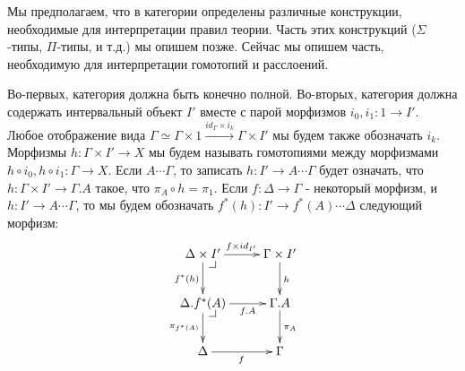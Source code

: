 \documentclass{amsart}
\makeatletter
\theoremstyle{definition}
\theoremstyle{remark}
\newcommand{\pb}[1][dr]{\save*!/#1-1.2pc/#1:(-1,1)@^{|-}\restore}
\newcommand{\po}[1][dr]{\save*!/#1+1.2pc/#1:(1,-1)@^{|-}\restore}
\numberwithin{figure}{section}
\makeatother
\begin{document}
Мы предполагаем, что в категории определены различные конструкции, необходимые для интерпретации правил теории.
Часть этих конструкций ($\Sigma$-типы, $\Pi$-типы, и т.д.) мы опишем позже.
Сейчас мы опишем часть, необходимую для интерпретации гомотопий и расслоений.

Во-первых, категория должна быть конечно полной.
Во-вторых, категория должна содержать интервальный объект $I'$ вместе с парой морфизмов $i_0, i_1 : 1 \to I'$.
Любое отображение вида $\Gamma \simeq \Gamma \times 1 \xrightarrow{id_\Gamma \times i_k} \Gamma \times I'$ мы будем также обозначать $i_k$.
Морфизмы $h : \Gamma \times I' \to X$ мы будем называть гомотопиями между морфизмами $h \circ i_0, h \circ i_1 : \Gamma \to X$.
Если $A \dotsb \Gamma$, то записать $h : I' \to A \dotsb \Gamma$ будет означать, что $h : \Gamma \times I' \to \Gamma.A$ такое, что $\pi_A \circ h = \pi_1$.
Если $f : \Delta \to \Gamma$ - некоторый морфизм, и $h : I' \to A \dotsb \Gamma$, то мы будем обозначать $f^*(h) : I' \to f^*(A) \dotsb \Delta$ следующий морфизм:
\[ \xymatrix{ \Delta \times I' \ar[r]^{f \times id_{I'}} \ar[d]_{f^*(h)} \pb & \Gamma \times I' \ar[d]^h \\
              \Delta.f^*(A) \ar[r]_-{f.A} \ar[d]_{\pi_{f^*(A)}} \pb          & \Gamma.A \ar[d]^{\pi_A} \\
              \Delta \ar[r]_f                                                & \Gamma
                 }\]

\begin{comment}
Также в категории должен быть выбран насыщенный класс морфизмов, которые мы называем \emph{тривиальными корасслоениями}.
Морфизмы, которые имеют правое свойство поднятия по отношению к тривиальным корасслоениям, мы называем \emph{расслоениями}.
Мы требуем, чтобы для любого $A \dotsb \Gamma$ морфизмы $\pi_A : \Gamma.A \to \Gamma$ являлись расслоениями.

Тривиальные корасслоения должны содержать морфизмы вида $i_0 : \Gamma \to \Gamma \times I'$ и
    $(\Gamma \times I' \amalg \Gamma \times I') \amalg_{\Gamma \amalg \Gamma} \Gamma \times I' \to \Gamma \times I' \times I'$, которые определяются как в следующей диаграмме:
\[ \xymatrix@-1pc{ \Gamma \amalg \Gamma \ar[rr]^{i_0 \amalg i_0} \ar[dd]_{[i_0, i_1]} & & \Gamma \times I' \amalg \Gamma \times I' \ar[dd] \ar[rddd]^{[i_0, i_1]} \\ \\
\Gamma \times I' \ar[rr] \ar[rrrd]_{i_0 \times id_{I'}} & & \po (\Gamma \times I' \amalg \Gamma \times I') \amalg_{\Gamma \amalg \Gamma} \Gamma \times I' \ar@{-->}[rd] \\
                                                                       & & & \Gamma \times I' \times I'
                 } \]
\end{comment}
\end{document}
